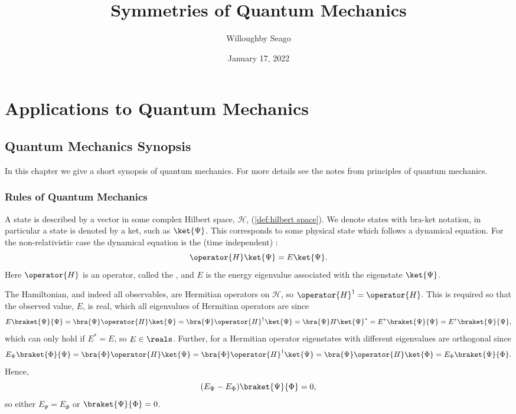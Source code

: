 \documentclass[fleqn]{NotesClass}
\title{Symmetries of Quantum Mechanics}
\author{Willoughby Seago}
\date{January 17, 2022}
\newcommand*{\hermit}{\dagger}
\newcommand*{\hilbert}{\mathcal{H}}
\begin{document}
    \frontmatter
    \titlepage
    \tableofcontents
    \listoffigures
    \mainmatter
    
    
    
    
    \part{Applications to Quantum Mechanics}
    \chapter{Quantum Mechanics Synopsis}
    In this chapter we give a short synopsis of quantum mechanics.
    For more details see the notes from principles of quantum mechanics.
    
    \section{Rules of Quantum Mechanics}
    A state is described by a vector in some complex Hilbert space, \(\hilbert\), (\cref{def:hilbert space}).
    We denote states with bra-ket notation, in particular a state is denoted by a ket, such as \(\ket{\Psi}\).
    This corresponds to some physical state which follows a dynamical equation.
    For the non-relativistic case the dynamical equation is the (time independent) :
    \begin{equation}
        \operator{H}\ket{\Psi} = E\ket{\Psi}.
    \end{equation}
    Here \(\operator{H}\) is an operator, called the , and \(E\) is the energy eigenvalue associated with the eigenstate \(\ket{\Psi}\).
    
    The Hamiltonian, and indeed all observables, are Hermitian operators on \(\hilbert\), so \(\operator{H}^\hermit = \operator{H}\).
    This is required so that the observed value, \(E\), is real, which all eigenvalues of Hermitian operators are since
    \begin{equation}
        E\braket{\Psi}{\Psi} = \bra{\Psi}\operator{H}\ket{\Psi} = \bra{\Psi}\operator{H}^\hermit\ket{\Psi} = \bra{\Psi}H\ket{\Psi}^* = E^*\braket{\Psi}{\Psi} = E^*\braket{\Psi}{\Psi},
    \end{equation}
    which can only hold if \(E^* = E\), so \(E \in \reals\).
    Further, for a Hermitian operator eigenstates with different eigenvalues are orthogonal since
    \begin{equation}
        E_{\Psi}\braket{\Phi}{\Psi} = \bra{\Phi}\operator{H}\ket{\Psi} = \bra{\Phi}\operator{H}^\hermit\ket{\Psi} = \bra{\Psi}\operator{H}\ket{\Phi} = E_{\Phi}\braket{\Psi}{\Phi}.
    \end{equation}
    Hence,
    \begin{equation}
        (E_{\Psi} - E_{\Phi})\braket{\Psi}{\Phi} = 0,
    \end{equation}
    so either \(E_{\Psi} = E_{\Phi}\) or \(\braket{\Psi}{\Phi} = 0\).
    
\end{document}
